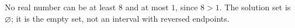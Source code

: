No real number can be at least $8$ and at most $1$, since $8>1$. The solution set is $\boxed{\varnothing}$; it is the empty set, not an interval with reversed endpoints.
